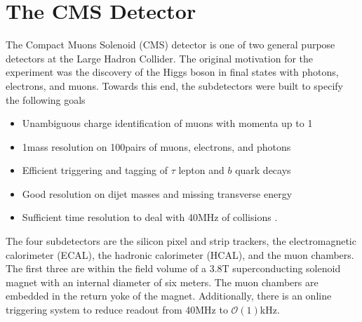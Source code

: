 \chapter{The CMS Detector}
\label{sec:cms}

The Compact Muons Solenoid (CMS) detector is one of two general purpose detectors at the Large Hadron Collider.
The original motivation for the experiment was the discovery of the Higgs boson in final states with photons, electrons, and muons.
Towards this end, the subdetectors were built to specify the following goals
\begin{itemize}
\item Unambiguous charge identification of muons with momenta up to 1\TeV
\item 1\GeV mass resolution on 100\GeV pairs of muons, electrons, and photons
\item Efficient triggering and tagging of $\tau$ lepton and $b$ quark decays
\item Good resolution on dijet masses and missing transverse energy
\item Sufficient time resolution to deal with 40MHz of collisions .
\end{itemize}
The four subdetectors are the silicon pixel and strip trackers, the electromagnetic calorimeter (ECAL), the hadronic calorimeter (HCAL), and the muon chambers.
The first three are within the field volume of a 3.8T superconducting solenoid magnet with an internal diameter of six meters.
The muon chambers are embedded in the return yoke of the magnet.
Additionally, there is an online triggering system to reduce readout from 40MHz to $\mathcal{O}(1)$kHz. 

